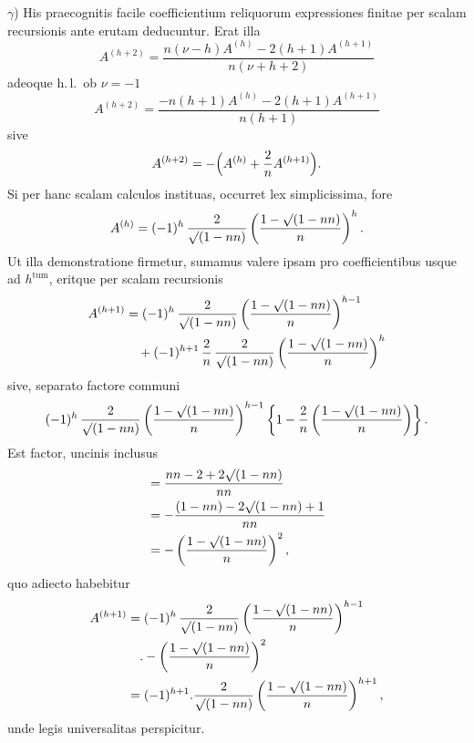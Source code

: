 $\gamma$) His praecognitis facile coefficientium reliquorum expressiones finitae per scalam recursionis ante erutam deducuntur. Erat illa
\[
A^{(h+2)} = \frac{n(\nu-h)A^{(h)} - 2(h+1)A^{(h+1)}}{n(\nu+h+2)}
\]
adeoque h.\,l.\ ob $\nu=-1$
\[
A^{(h+2)} = \frac{-n(h+1)A^{(h)} - 2(h+1)A^{(h+1)}}{n(h+1)}
\]
sive
\[
A^{(h+2)} = -\Bigl(A^{(h)} + \frac{2}{n}A^{(h+1)}\Bigr).
\]
Si per hanc scalam calculos instituas, occurret lex simplicissima, fore
\[
A^{(h)} = (-1)^h\,\frac{2}{\mathord{\surd}(1-nn)}\left(\frac{1-\mathord{\surd}(1-nn)}{n}\right)^{h}.
\]
Ut illa demonstratione firmetur, sumamus valere ipsam pro coefficientibus usque ad $h^{\text{tum}}$, eritque per scalam recursionis
\[
\begin{aligned}
A^{(h+1)} & = (-1)^h\,\frac{2}{\mathord{\surd}(1-nn)}\left(\frac{1-\mathord{\surd}(1-nn)}{n}\right)^{h-1}\\&\quad + (-1)^{h+1}\,\frac{2}{n}\,\frac{2}{\mathord{\surd}(1-nn)}\left(\frac{1-\mathord{\surd}(1-nn)}{n}\right)^{h}
\end{aligned}
\]
sive, separato factore communi
\[
(-1)^h\,\frac{2}{\mathord{\surd}(1-nn)}\left(\frac{1-\mathord{\surd}(1-nn)}{n}\right)^{h-1}\left\{1-\frac{2}{n}\left(\frac{1-\mathord{\surd}(1-nn)}{n}\right)\right\}.
\]
Est factor, uncinis inclusus
\[
\begin{aligned}
&= \frac{nn-2+2\mathord{\surd}(1-nn)}{nn}\\&= -\frac{(1-nn)-2\mathord{\surd}(1-nn)+1}{nn}\\&= -\left(\frac{1-\mathord{\surd}(1-nn)}{n}\right)^{2},
\end{aligned}
\]
quo adiecto habebitur
\[
\begin{aligned}
A^{(h+1)} & = (-1)^h\,\frac{2}{\mathord{\surd}(1-nn)}\left(\frac{1-\mathord{\surd}(1-nn)}{n}\right)^{h-1}\\&\quad .  -\left(\frac{1-\mathord{\surd}(1-nn)}{n}\right)^{2}\\&= (-1)^{h+1} . \frac{2}{\mathord{\surd}(1-nn)}\left(\frac{1-\mathord{\surd}(1-nn)}{n}\right)^{h+1},
\end{aligned}
\]
unde legis universalitas perspicitur.

